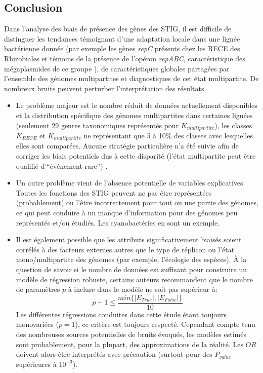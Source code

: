 \subsection{Conclusion}\label{reglogconcl}
 Dans l'analyse des biais de présence des gènes des STIG, il est difficile de distinguer les tendances témoignant d'une adaptation locale dans une lignée bactérienne donnée (par exemple les gènes \textit{repC} présents chez les RECE des Rhizobiales et témoins de la présence de l'opéron \textit{repABC}, caractéristique des mégaplasmides de ce groupe \citep{Slater2009}), de caractéristiques globales partagées par l'ensemble des génomes multipartites et diagnostiques de cet état multipartite. De nombreux bruits peuvent perturber l'interprétation des résultats.
 \begin{itemize}
 \item Le problème majeur est le nombre réduit de données actuellement disponibles et la distribution spécifique des génomes multipartites dans certaines lignées (seulement 29 genres taxonomiques représentés pour $K_{multipartite}$), les classes $K_{RECE}$ et $K_{multipartite}$ ne représentant que 5 à 10\% des classes avec lesquelles elles sont comparées. Aucune stratégie particulière n'a été suivie afin de corriger les biais potentiels dus à cette disparité (l'état multipartite peut être qualifié d'“événement rare”) \citep{king2001logistic}. 

\item Un autre problème vient de l'absence potentielle de variables explicatives. Toutes les fonctions des STIG peuvent ne pas être représentées (probablement) ou l'être incorrectement pour tout ou une partie des génomes, ce qui peut conduire à un manque d'information pour des génomes peu représentés et/ou étudiés. Les cyanobactéries en sont un exemple.

\item Il est également possible que les attributs significativement biaisés soient corrélés à des facteurs externes autres que le type de réplicon ou l'état mono/multipartite des génomes (par exemple, l'écologie des espèces). À la question de savoir si le nombre de données est suffisant pour construire un modèle de régression robuste, certains auteurs \citep{hosmer2013applied} recommandent que le nombre de paramètres $p$ à inclure dans le modèle ne soit pas supérieur à:
\begin{equation}
 	p+1\leq \frac{min\{|E_{True}|,|E_{False}|\}}{10}
\end{equation}
 Les différentes régressions conduites dans cette étude étant toujours monovariées ($p=1$), ce critère est toujours respecté. Cependant compte tenu des nombreuses sources potentielles de bruits évoqués, les modèles estimés sont probablement, pour la plupart, des approximations de la réalité. Les $OR$ doivent alors être interprétés avec précaution (surtout pour des $P_{value}$ supérieures à $10^{-3}$).


\end{itemize}
